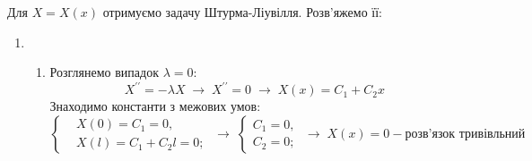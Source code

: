 \documentclass[a4paper, 12pt]{extreport}
\begin{document}
Для $X = X(x)$ отримуємо задачу Штурма-Ліувілля. Розв'яжемо її:
\begin{enumerate}
    \item[] \begin{enumerate}
        \item Розглянемо випадок $\lambda = 0$:
        \begin{equation*}
            X^{\prime\prime} = -\lambda X
            \;\to\;
            X^{\prime\prime} = 0
            \;\to\;
            X(x) = C_1 + C_2 x
        \end{equation*}
        Знаходимо константи з межових умов:
        \begin{equation*}
            \left\{ \begin{aligned}
                &X(0) = C_1 = 0, \\ 
                &X(l) = C_1 + C_2 l = 0;
            \end{aligned} \right.
            \;\to\;
            \left\{ \begin{aligned}
                C_1 = 0, \\ 
                C_2 = 0;
            \end{aligned} \right.
            \;\to\;
            X(x) = 0 - \text{розв'язок тривівльний}
        \end{equation*}
    

\end{enumerate}
\end{enumerate}
\end{document}
